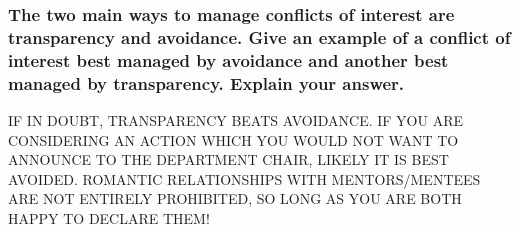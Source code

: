 \documentclass[12pt]{beamer}
\begin{document}
\begin{frame}
\frametitle{
The two main ways to manage conflicts of interest are transparency and avoidance. Give an example of a conflict of interest best managed by avoidance and another best managed by transparency. Explain your answer.
}




\end{frame}
\begin{frame}
{\it


}


\vspace{10mm}

IF IN DOUBT, TRANSPARENCY BEATS AVOIDANCE. IF YOU ARE CONSIDERING AN ACTION WHICH YOU WOULD NOT WANT TO ANNOUNCE TO THE DEPARTMENT CHAIR, LIKELY IT IS BEST AVOIDED. ROMANTIC RELATIONSHIPS WITH MENTORS/MENTEES ARE NOT ENTIRELY PROHIBITED, SO LONG AS YOU ARE BOTH HAPPY TO DECLARE THEM!


\end{frame}
\end{document}
